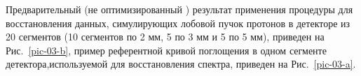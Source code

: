 \documentclass[12pt, a4paper, notitlepage, onecolumn]{article}
\begin{document}

Предварительный (не оптимизированный ) результат применения процедуры для восстановления данных, симулирующих лобовой пучок протонов в детекторе из 20 сегментов (10 сегментов по 2 мм, 5 по 3 мм и 5 по 5 мм), приведен на Рис.~\ref{pic-03-b}, пример референтной кривой поглощения в одном сегменте детектора,используемой для восстановления спектра, приведен на Рис.~\ref{pic-03-a}. %
\end{document}
